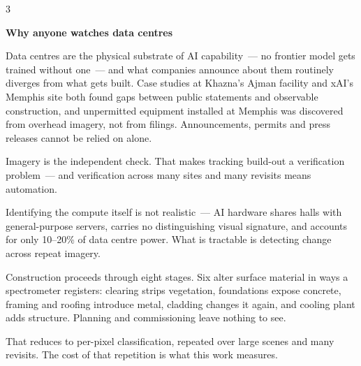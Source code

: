 \documentclass[a0,portrait,final]{a0poster}
\newcommand{\headsize}{\fontsize{48}{58}\selectfont}
\newcommand{\bodysize}{\fontsize{30}{40}\selectfont}
\newcommand{\shead}[1]{%
  \par\vspace{16mm}{\headsize\bfseries\color{cq}#1}\par\vspace{6mm}}
\newcommand{\sheadtop}[1]{%
  \par{\headsize\bfseries\color{cq}#1}\par\vspace{6mm}}
\newcommand{\gap}{\par\vspace{7mm}}
\begin{document}
\begin{multicols}{3}
\raggedcolumns
\bodysize

\sheadtop{Why anyone watches data centres}

Data centres are the physical substrate of AI capability~--- no frontier model
gets trained without one~--- and what companies announce about them routinely
diverges from what gets built. Case studies at Khazna's Ajman facility and xAI's
Memphis site both found gaps between public statements and observable
construction, and unpermitted equipment installed at Memphis was discovered from
overhead imagery, not from filings. Announcements, permits and press releases
cannot be relied on alone.
\gap
Imagery is the independent check. That makes tracking build-out a verification
problem~--- and verification across many sites and many revisits means
automation.

\shead{Which stages leave a signature}

Identifying the compute itself is not realistic~--- AI hardware shares halls
with general-purpose servers, carries no distinguishing visual signature, and
accounts for only 10--20\% of data centre power. What is tractable is detecting
change across repeat imagery.
\gap
Construction proceeds through eight stages. Six alter surface material in ways a
spectrometer registers: clearing strips vegetation, foundations expose concrete,
framing and roofing introduce metal, cladding changes it again, and cooling
plant adds structure. Planning and commissioning leave nothing to see.
\gap
That reduces to per-pixel classification, repeated over large scenes and many
revisits. The cost of that repetition is what this work measures.


\end{multicols}
\end{document}
